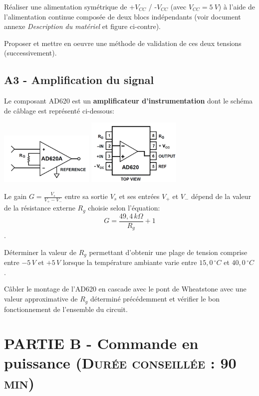 \documentclass[a4paper,11pt]{article}
\begin{document}
\Real Réaliser une alimentation symétrique de +$V_{CC}$ / -$V_{CC}$ (avec $V_{CC} = 5~V$) à l'aide de l'alimentation continue composée de deux blocs indépendants (voir document annexe \textit{Description du matériel} et figure ci-contre).

\Real Proposer et mettre en oeuvre une méthode de validation de ces deux tensions (successivement).
	

\subsection*{A3 - Amplification du signal}

Le composant AD620 est un \textbf{amplificateur d'instrumentation} dont le schéma de câblage est représenté ci-dessous:
	
	\begin{center}
		\includegraphics[width=4.5cm]{images/AD620.png}
		\hspace{1 cm}
		\includegraphics[width=4.5cm]{images/AD620SOIC.png}
	\end{center}
	
Le gain $G = \frac{V_s}{V_+ - V_-}$ entre sa sortie $V_s$ et ses entrées $V_+$ et $V_-$ dépend de la valeur de la résistance externe $R_g$ choisie selon l'équation:
$$G = \frac{49,4 \,k\Omega}{R_g}+1$$.

\Real Déterminer la valeur de $R_g$ permettant d'obtenir une plage de tension comprise entre $-5 \,V$ et $+5 \,V$ lorsque la température ambiante varie entre $15,0 \,^\circ C$ et $40,0 \,^\circ C$.

\Real Câbler le montage de l'AD620 en cascade avec le pont de Wheatstone avec une valeur approximative de $R_g$ déterminé précédemment et vérifier le bon fonctionnement de l'ensemble du circuit.


\newpage

\section{PARTIE B - Commande en puissance \textsc{\normalsize(Durée conseillée : 90 min)} }
\end{document}
